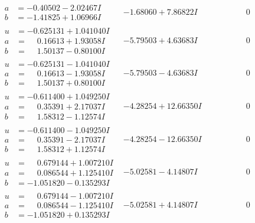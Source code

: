 \documentclass[1p]{elsarticle_modified}
\theoremstyle{definition}
\begin{document}
$$\begin{array}{c|c|c}
\begin{aligned}
a &= -0.40502 - 2.02467 I \\
b &= -1.41825 + 1.06966 I\end{aligned}
 & -1.68060 + 7.86822 I & \phantom{-0.000000 } 0 \\ \hline\begin{aligned}
u &= -0.625131 + 1.041040 I \\
a &= \phantom{-}0.16613 + 1.93058 I \\
b &= \phantom{-}1.50137 - 0.80100 I\end{aligned}
 & -5.79503 + 4.63683 I & \phantom{-0.000000 } 0 \\ \hline\begin{aligned}
u &= -0.625131 - 1.041040 I \\
a &= \phantom{-}0.16613 - 1.93058 I \\
b &= \phantom{-}1.50137 + 0.80100 I\end{aligned}
 & -5.79503 - 4.63683 I & \phantom{-0.000000 } 0 \\ \hline\begin{aligned}
u &= -0.611400 + 1.049250 I \\
a &= \phantom{-}0.35391 + 2.17037 I \\
b &= \phantom{-}1.58312 - 1.12574 I\end{aligned}
 & -4.28254 + 12.66350 I & \phantom{-0.000000 } 0 \\ \hline\begin{aligned}
u &= -0.611400 - 1.049250 I \\
a &= \phantom{-}0.35391 - 2.17037 I \\
b &= \phantom{-}1.58312 + 1.12574 I\end{aligned}
 & -4.28254 - 12.66350 I & \phantom{-0.000000 } 0 \\ \hline\begin{aligned}
u &= \phantom{-}0.679144 + 1.007210 I \\
a &= \phantom{-}0.086544 + 1.125410 I \\
b &= -1.051820 - 0.135293 I\end{aligned}
 & -5.02581 - 4.14807 I & \phantom{-0.000000 } 0 \\ \hline\begin{aligned}
u &= \phantom{-}0.679144 - 1.007210 I \\
a &= \phantom{-}0.086544 - 1.125410 I \\
b &= -1.051820 + 0.135293 I\end{aligned}
 & -5.02581 + 4.14807 I & \phantom{-0.000000 } 0 \\ \hline\begin{aligned}

\end{aligned}
\end{array}$$
\end{document}
